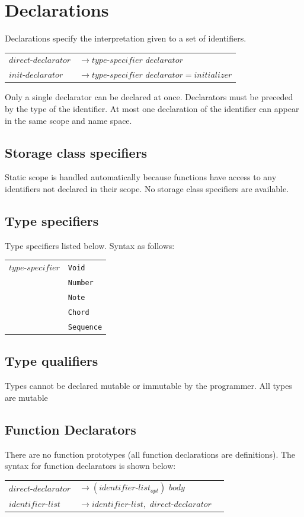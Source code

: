 \documentclass[12pt,A4]{book}
\begin{document}
\section{Declarations}
Declarations specify the interpretation given to a set of identifiers.

\begin{tabular}{l l}
$direct\mbox{-}declarator$ & $\rightarrow type\mbox{-}specifier$ $declarator$\\
$init\mbox{-}declarator$ & $\rightarrow type\mbox{-}specifier$ $declarator = initializer$
\end{tabular}

Only a single declarator can be declared at once.  Declarators must be preceded by the type of the identifier.  At most one declaration of the identifier can appear in the same scope and name space.  
\subsection{Storage class specifiers}
Static scope is handled automatically because functions have access to any identifiers not declared in their scope. No storage class specifiers are available.
\subsection{Type specifiers}
Type specifiers listed below.  Syntax as follows:

\begin{tabular}{l l}
$type\mbox{-}specifier$  & \verb|Void| \\
& \verb|Number|\\
& \verb|Note|\\
& \verb|Chord|\\
& \verb|Sequence|
\end{tabular}

\subsection{Type qualifiers}
Types cannot be declared mutable or immutable by the programmer.  All types are mutable
\subsection{Function Declarators}
There are no function prototypes (all function declarations are definitions).  The syntax for function declarators is shown below:

\begin{tabular}{l l l}
$direct\mbox{-}declarator $ & $\rightarrow (identifier\mbox{-}list_{opt})$ { $body$ } \\
$identifier\mbox{-}list$  & $\rightarrow identifier\mbox{-}list,$ $direct\mbox{-}declarator$
\end{tabular}
\end{document}
